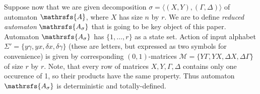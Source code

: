 \documentclass[11pt]{llncs}
\newcommand{\A}{\mathrsfs{A}}
\newcommand{\AD}{\mathrsfs{A_{\sigma}}}
\newcommand{\G}{\Gamma}
\newcommand{\D}{\Delta}
\newcommand{\g}{\gamma}
\newcommand{\dl}{\delta}
\newcommand{\rk}{rk}
\begin{document}
Suppose now that we are given decomposition $\sigma = \langle(X,Y), (\G,\D)\rangle$ of 
automaton $\A$, where $X$ has size $n$ by $r$.
We are to define \emph{reduced automaton} $\AD$ that is going to be key object of this paper.
Automaton $\AD$ has $\{1,\ldots, r\}$ as a state
set. Action of input alphabet $\Sigma' = \{ y\g, yx, \dl x, \dl\g \}$ (these are letters, 
but expressed as two symbols for convenience) is given
by corresponding $(0,1)$-matrices $\mathcal{M} =\{ Y\G , YX, \D X, \D\G \}$ of size $r$ by $r$.
Note, that every row of matrices $X, Y, \G, \D$ contains only one occurence of 1, 
so their products have the same property. Thus automaton $\AD$
is deterministic and totally-defined.

\end{document}
